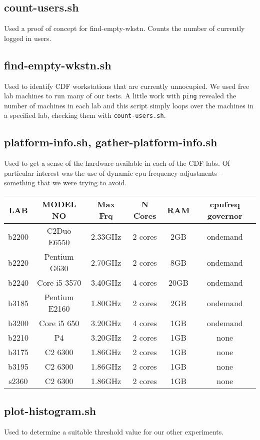 \documentclass{article}
\begin{document}
\subsection{count-users.sh}
Used a proof of concept for find-empty-wkstn. Counts the number of currently
logged in users.

\subsection{find-empty-wkstn.sh}
\label{tool:find-empty}
Used to identify CDF workstations that are currently unnocupied. We used free
lab machines to run many of our tests. A little work with \lstinline{ping}
revealed the number of machines in each lab and this script simply loops over
the machines in a specified lab, checking them with \lstinline{count-users.sh}.

\subsection{platform-info.sh, gather-platform-info.sh}
\label{tool:platform}
Used to get a sense of the hardware available in each of the CDF labs. Of particular interest was the use of dynamic cpu frequency adjustments -- something that we were trying to avoid. 

\begin{tabular}{ | c | c | c | c | c | c |}
\hline
LAB   & MODEL NO      & Max Frq & N Cores & RAM  & cpufreq governor \\
\hline 
b2200 & C2Duo E6550   & 2.33GHz & 2 cores &  2GB & ondemand \\
b2220 & Pentium G630  & 2.70GHz & 2 cores &  8GB & ondemand \\
b2240 & Core i5 3570  & 3.40GHz & 4 cores & 20GB & ondemand \\
b3185 & Pentium E2160 & 1.80GHz & 2 cores &  2GB & ondemand \\
b3200 & Core i5 650   & 3.20GHz & 4 cores &  1GB & ondemand \\
\hline
b2210 & P4            & 3.20GHz & 2 cores &  1GB & none \\
b3175 & C2 6300       & 1.86GHz & 2 cores &  1GB & none \\
b3195 & C2 6300       & 1.86GHz & 2 cores &  1GB & none \\
s2360 & C2 6300       & 1.86GHz & 2 cores &  1GB & none \\
\hline
\end{tabular}

\subsection{plot-histogram.sh}
Used to determine a suitable threshold value for our other experiments.
\end{document}
